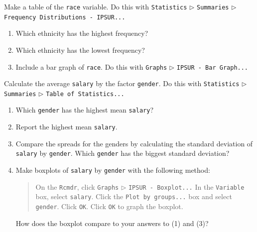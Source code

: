 \documentclass[10pt,english]{scrbook}
\begin{document}
\begin{xca}
Make a table of the \texttt{race} variable. Do this with \texttt{Statistics} \(\triangleright\) \texttt{Summaries} \(\triangleright\) \texttt{Frequency Distributions - IPSUR...}
\begin{enumerate}
\item Which ethnicity has the highest frequency?
\item Which ethnicity has the lowest frequency?
\item Include a bar graph of \texttt{race}. Do this with \texttt{Graphs} \(\triangleright\) \texttt{IPSUR - Bar Graph...}
\end{enumerate}
\end{xca}

\begin{xca}
Calculate the average \texttt{salary} by the factor \texttt{gender}. Do this with \texttt{Statistics} \(\triangleright\) \texttt{Summaries} \(\triangleright\) \texttt{Table of Statistics...} 
\begin{enumerate}
\item Which \texttt{gender} has the highest mean \texttt{salary}?
\item Report the highest mean \texttt{salary}.
\item Compare the spreads for the genders by calculating the standard deviation of \texttt{salary} by \texttt{gender}. Which \texttt{gender} has the biggest standard deviation?
\item Make boxplots of \texttt{salary} by \texttt{gender} with the following method:
\begin{quote}
On the \texttt{Rcmdr}, click \texttt{Graphs} \(\triangleright\) \texttt{IPSUR - Boxplot...}
In the \texttt{Variable} box, select \texttt{salary}.
Click the \texttt{Plot by groups...} box and select \texttt{gender}. Click \texttt{OK}.
Click \texttt{OK} to graph the boxplot.
\end{quote}
How does the boxplot compare to your answers to (1) and (3)?
\end{enumerate}
\end{xca}
\end{document}

